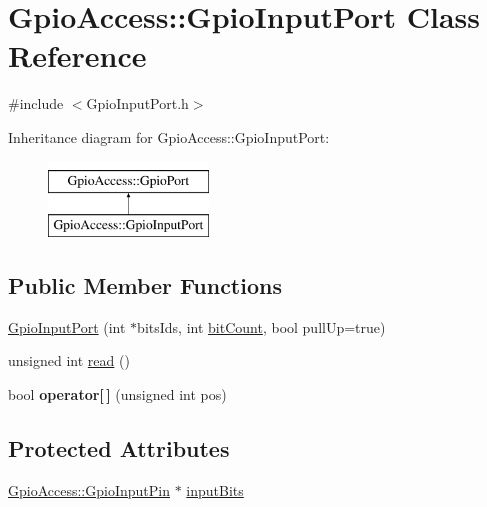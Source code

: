 \hypertarget{class_gpio_access_1_1_gpio_input_port}{\section{\-Gpio\-Access\-:\-:\-Gpio\-Input\-Port \-Class \-Reference}
\label{class_gpio_access_1_1_gpio_input_port}
}


{\ttfamily \#include $<$\-Gpio\-Input\-Port.\-h$>$}

\-Inheritance diagram for \-Gpio\-Access\-:\-:\-Gpio\-Input\-Port\-:\begin{figure}[H]
\begin{center}
\leavevmode
\includegraphics[height=2.000000cm]{class_gpio_access_1_1_gpio_input_port}
\end{center}
\end{figure}
\subsection*{\-Public \-Member \-Functions}
\begin{DoxyCompactItemize}
\item 
\hyperlink{class_gpio_access_1_1_gpio_input_port_aeeed64420582ca1ebc2d741e140b67b9}{\-Gpio\-Input\-Port} (int $\ast$bits\-Ids, int \hyperlink{class_gpio_access_1_1_gpio_port_a7708b465b3c98a32e592ee985c3dcf8b}{bit\-Count}, bool pull\-Up=true)
\item 
unsigned int \hyperlink{class_gpio_access_1_1_gpio_input_port_aeed5b1a3eccb39dd6cff6f2e281a890b}{read} ()
\item 
\hypertarget{class_gpio_access_1_1_gpio_input_port_abda439bc45285d6cac9776ab8b61a978}{bool {\bfseries operator\mbox{[}$\,$\mbox{]}} (unsigned int pos)}\label{class_gpio_access_1_1_gpio_input_port_abda439bc45285d6cac9776ab8b61a978}

\end{DoxyCompactItemize}
\subsection*{\-Protected \-Attributes}
\begin{DoxyCompactItemize}
\item 
\hyperlink{class_gpio_access_1_1_gpio_input_pin}{\-Gpio\-Access\-::\-Gpio\-Input\-Pin} $\ast$ \hyperlink{class_gpio_access_1_1_gpio_input_port_a4817dfd3065aebdb9d9231f54bff8ba5}{input\-Bits}
\end{DoxyCompactItemize}


